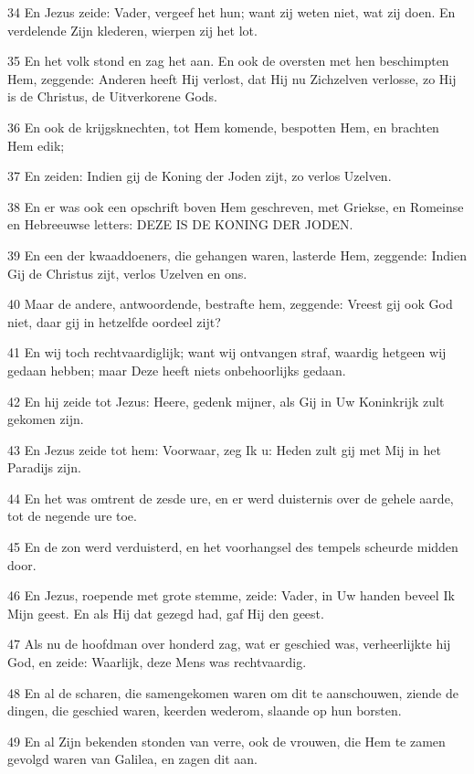 \par 34 En Jezus zeide: Vader, vergeef het hun; want zij weten niet, wat zij doen. En verdelende Zijn klederen, wierpen zij het lot.
\par 35 En het volk stond en zag het aan. En ook de oversten met hen beschimpten Hem, zeggende: Anderen heeft Hij verlost, dat Hij nu Zichzelven verlosse, zo Hij is de Christus, de Uitverkorene Gods.
\par 36 En ook de krijgsknechten, tot Hem komende, bespotten Hem, en brachten Hem edik;
\par 37 En zeiden: Indien gij de Koning der Joden zijt, zo verlos Uzelven.
\par 38 En er was ook een opschrift boven Hem geschreven, met Griekse, en Romeinse en Hebreeuwse letters: DEZE IS DE KONING DER JODEN.
\par 39 En een der kwaaddoeners, die gehangen waren, lasterde Hem, zeggende: Indien Gij de Christus zijt, verlos Uzelven en ons.
\par 40 Maar de andere, antwoordende, bestrafte hem, zeggende: Vreest gij ook God niet, daar gij in hetzelfde oordeel zijt?
\par 41 En wij toch rechtvaardiglijk; want wij ontvangen straf, waardig hetgeen wij gedaan hebben; maar Deze heeft niets onbehoorlijks gedaan.
\par 42 En hij zeide tot Jezus: Heere, gedenk mijner, als Gij in Uw Koninkrijk zult gekomen zijn.
\par 43 En Jezus zeide tot hem: Voorwaar, zeg Ik u: Heden zult gij met Mij in het Paradijs zijn.
\par 44 En het was omtrent de zesde ure, en er werd duisternis over de gehele aarde, tot de negende ure toe.
\par 45 En de zon werd verduisterd, en het voorhangsel des tempels scheurde midden door.
\par 46 En Jezus, roepende met grote stemme, zeide: Vader, in Uw handen beveel Ik Mijn geest. En als Hij dat gezegd had, gaf Hij den geest.
\par 47 Als nu de hoofdman over honderd zag, wat er geschied was, verheerlijkte hij God, en zeide: Waarlijk, deze Mens was rechtvaardig.
\par 48 En al de scharen, die samengekomen waren om dit te aanschouwen, ziende de dingen, die geschied waren, keerden wederom, slaande op hun borsten.
\par 49 En al Zijn bekenden stonden van verre, ook de vrouwen, die Hem te zamen gevolgd waren van Galilea, en zagen dit aan.
